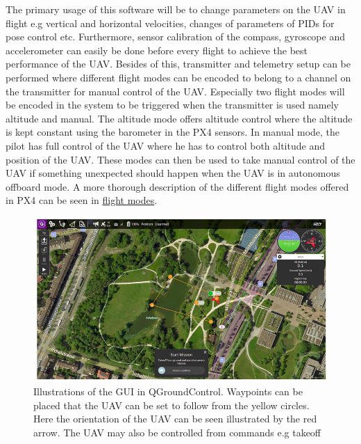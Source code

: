 \documentclass[../Head/report.tex]{subfiles}
\begin{document}
The primary usage of this software will be to change parameters on the UAV in flight e.g vertical and horizontal velocities, changes of parameters of PIDs for pose control etc. Furthermore, sensor calibration of the compass, gyroscope and accelerometer can easily be done before every flight to achieve the best performance of the UAV. Besides of this, transmitter and telemetry setup can be performed where different flight modes can be encoded to belong to a channel on the transmitter for manual control of the UAV. Especially two flight modes will be encoded in the system to be triggered when the transmitter is used namely altitude and manual. The altitude mode offers altitude control where the altitude is kept constant using the barometer in the PX4 sensors. In manual mode, the pilot has full control of the UAV where he has to control both altitude and position of the UAV. These modes can then be used to take manual control of the UAV if something unexpected should happen when the UAV is in autonomous offboard mode. A more thorough description of the different flight modes offered in PX4 can be seen in \href{https://docs.px4.io/v1.9.0/en/flight_modes/}{flight modes}.

\begin{figure}[H]
    \centering
    \includegraphics[width=0.7\linewidth]{../Figures/qgroundcontrol.png}
    \caption{Illustrations of the GUI in QGroundControl. Waypoints can be placed that the UAV can be set to follow from the yellow circles. Here the orientation of the UAV can be seen illustrated by the red arrow. The UAV may also be controlled from commands e.g takeoff}
    \label{fig:qgroundcontrol}
\end{figure}
\end{document}
